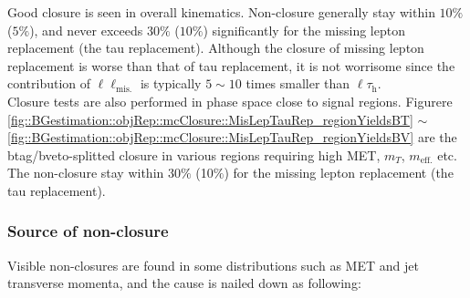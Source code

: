 Good closure is seen in overall kinematics. Non-closure generally stay within $10\%$ ($5\%$), and never exceeds $30\%$ ($10\%$) significantly for the missing lepton replacement (the tau replacement).
Although the closure of missing lepton replacement is worse than that of tau replacement, it is not worrisome since the contribution of $\ell\ell_{\mathrm{mis.}}$ is typically $5\sim10$ times smaller than $\ell\tau_{\mathrm{h}}$. \\

Closure tests are also performed in phase space close to signal regions. 
Figurere \ref{fig::BGestimation::objRep::mcClosure::MisLepTauRep_regionYieldsBT} $\sim$ \ref{fig::BGestimation::objRep::mcClosure::MisLepTauRep_regionYieldsBV} 
are the btag/bveto-splitted closure in various regions requiring high MET, $m_{T}$, $m_{\mathrm{eff.}}$ etc. The non-closure stay within 30$\%$ (10$\%$) for the missing lepton replacement (the tau replacement).\\








\clearpage
\subsubsection{Source of non-closure} \label{sec::BGestimation::objRep::NonClosure} 
Visible non-closures are found in some distributions such as MET and jet transverse momenta, and the cause is nailed down as following:

